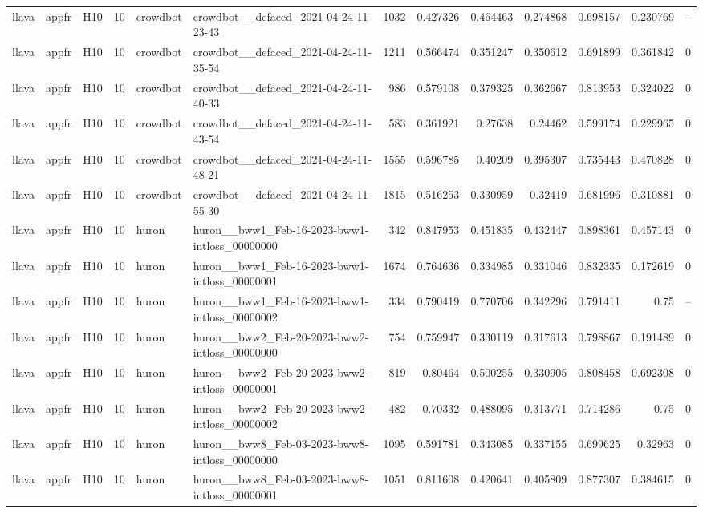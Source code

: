 \begin{longtable}{lllrllrrrrrrr}
llava & appfr & H10 & 10 & crowdbot & crowdbot\_\_defaced\_2021-04-24-11-23-43 & 1032 & 0.427326 & 0.464463 & 0.274868 & 0.698157 & 0.230769 & -- \\
llava & appfr & H10 & 10 & crowdbot & crowdbot\_\_defaced\_2021-04-24-11-35-54 & 1211 & 0.566474 & 0.351247 & 0.350612 & 0.691899 & 0.361842 & 0 \\
llava & appfr & H10 & 10 & crowdbot & crowdbot\_\_defaced\_2021-04-24-11-40-33 & 986 & 0.579108 & 0.379325 & 0.362667 & 0.813953 & 0.324022 & 0 \\
llava & appfr & H10 & 10 & crowdbot & crowdbot\_\_defaced\_2021-04-24-11-43-54 & 583 & 0.361921 & 0.27638 & 0.24462 & 0.599174 & 0.229965 & 0 \\
llava & appfr & H10 & 10 & crowdbot & crowdbot\_\_defaced\_2021-04-24-11-48-21 & 1555 & 0.596785 & 0.40209 & 0.395307 & 0.735443 & 0.470828 & 0 \\
llava & appfr & H10 & 10 & crowdbot & crowdbot\_\_defaced\_2021-04-24-11-55-30 & 1815 & 0.516253 & 0.330959 & 0.32419 & 0.681996 & 0.310881 & 0 \\
llava & appfr & H10 & 10 & huron & huron\_\_bww1\_Feb-16-2023-bww1-intloss\_00000000 & 342 & 0.847953 & 0.451835 & 0.432447 & 0.898361 & 0.457143 & 0 \\
llava & appfr & H10 & 10 & huron & huron\_\_bww1\_Feb-16-2023-bww1-intloss\_00000001 & 1674 & 0.764636 & 0.334985 & 0.331046 & 0.832335 & 0.172619 & 0 \\
llava & appfr & H10 & 10 & huron & huron\_\_bww1\_Feb-16-2023-bww1-intloss\_00000002 & 334 & 0.790419 & 0.770706 & 0.342296 & 0.791411 & 0.75 & -- \\
llava & appfr & H10 & 10 & huron & huron\_\_bww2\_Feb-20-2023-bww2-intloss\_00000000 & 754 & 0.759947 & 0.330119 & 0.317613 & 0.798867 & 0.191489 & 0 \\
llava & appfr & H10 & 10 & huron & huron\_\_bww2\_Feb-20-2023-bww2-intloss\_00000001 & 819 & 0.80464 & 0.500255 & 0.330905 & 0.808458 & 0.692308 & 0 \\
llava & appfr & H10 & 10 & huron & huron\_\_bww2\_Feb-20-2023-bww2-intloss\_00000002 & 482 & 0.70332 & 0.488095 & 0.313771 & 0.714286 & 0.75 & 0 \\
llava & appfr & H10 & 10 & huron & huron\_\_bww8\_Feb-03-2023-bww8-intloss\_00000000 & 1095 & 0.591781 & 0.343085 & 0.337155 & 0.699625 & 0.32963 & 0 \\
llava & appfr & H10 & 10 & huron & huron\_\_bww8\_Feb-03-2023-bww8-intloss\_00000001 & 1051 & 0.811608 & 0.420641 & 0.405809 & 0.877307 & 0.384615 & 0 \\

\end{longtable}
